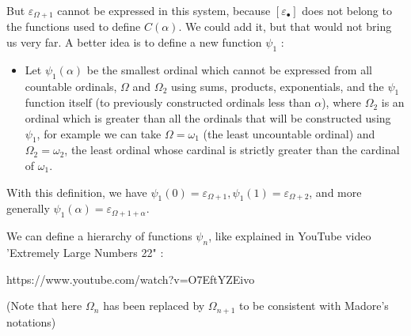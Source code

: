 \documentclass[10pt]{article}
\begin{document}
But \( \varepsilon_{\Omega+1} \) cannot be expressed in this system, because \( [ \varepsilon_\bullet ] \) does not belong to the functions used to define \( C(\alpha) \). We could add it, but that would not bring us very far. A better idea is to define a new function \( \psi_1 \) :

\begin{itemize}\item[\hspace{12pt}]

Let \( \psi_1(\alpha) \) be the smallest ordinal which cannot be expressed from all countable ordinals, \( \Omega \) and \( \Omega _{2} \) using sums, products, exponentials, and the \( \psi _{1} \) function itself (to previously constructed ordinals less than \( \alpha \)), where \( \Omega_2 \) is an ordinal which is greater than all the ordinals that will be constructed using \( \psi_1 \), for example we can take \( \Omega = \omega_1 \) (the least uncountable ordinal) and \( \Omega_2 = \omega_2 \), the least ordinal whose cardinal is strictly greater than the cardinal of \( \omega_1 \).

\end{itemize}

With this definition, we have \( \psi_1(0) = \varepsilon_{\Omega+1}, \psi_1(1) = \varepsilon_{\Omega+2} \), and more generally \( \psi_1(\alpha) = \varepsilon_{\Omega+1+\alpha} \).

\bigskip

We can define a hierarchy of functions \( \psi_n \), like explained in YouTube video 'Extremely Large Numbers 22" :

https://www.youtube.com/watch?v=O7EftYZEivo

(Note that here \( \Omega_n \) has been replaced by \( \Omega_{n+1} \) to be consistent with Madore's notations)
\end{document}
